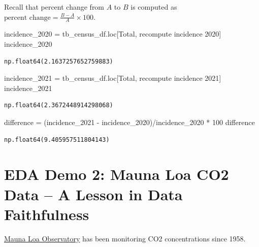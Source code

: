 \documentclass[
  letterpaper,
  DIV=11,
  numbers=noendperiod]{scrreprt}
\newenvironment{Shaded}{\begin{snugshade}}{\end{snugshade}}
\newcommand{\DecValTok}[1]{\textcolor[rgb]{0.68,0.00,0.00}{#1}}
\newcommand{\NormalTok}[1]{\textcolor[rgb]{0.00,0.23,0.31}{#1}}
\newcommand{\OperatorTok}[1]{\textcolor[rgb]{0.37,0.37,0.37}{#1}}
\newcommand{\StringTok}[1]{\textcolor[rgb]{0.13,0.47,0.30}{#1}}
\begin{document}
Recall that percent change from \(A\) to \(B\) is computed as
\(\text{percent change} = \frac{B - A}{A} \times 100\).

\begin{Shaded}
\begin{Highlighting}[]
\NormalTok{incidence\_2020 }\OperatorTok{=}\NormalTok{ tb\_census\_df.loc[}\StringTok{\textquotesingle{}Total\textquotesingle{}}\NormalTok{, }\StringTok{\textquotesingle{}recompute incidence 2020\textquotesingle{}}\NormalTok{]}
\NormalTok{incidence\_2020}
\end{Highlighting}
\end{Shaded}

\begin{verbatim}
np.float64(2.1637257652759883)
\end{verbatim}

\begin{Shaded}
\begin{Highlighting}[]
\NormalTok{incidence\_2021 }\OperatorTok{=}\NormalTok{ tb\_census\_df.loc[}\StringTok{\textquotesingle{}Total\textquotesingle{}}\NormalTok{, }\StringTok{\textquotesingle{}recompute incidence 2021\textquotesingle{}}\NormalTok{]}
\NormalTok{incidence\_2021}
\end{Highlighting}
\end{Shaded}

\begin{verbatim}
np.float64(2.3672448914298068)
\end{verbatim}

\begin{Shaded}
\begin{Highlighting}[]
\NormalTok{difference }\OperatorTok{=}\NormalTok{ (incidence\_2021 }\OperatorTok{{-}}\NormalTok{ incidence\_2020)}\OperatorTok{/}\NormalTok{incidence\_2020 }\OperatorTok{*} \DecValTok{100}
\NormalTok{difference}
\end{Highlighting}
\end{Shaded}

\begin{verbatim}
np.float64(9.405957511804143)
\end{verbatim}

\section{EDA Demo 2: Mauna Loa CO2 Data -- A Lesson in Data
Faithfulness}\label{eda-demo-2-mauna-loa-co2-data-a-lesson-in-data-faithfulness}

\href{https://gml.noaa.gov/ccgg/trends/data.html}{Mauna Loa Observatory}
has been monitoring CO2 concentrations since 1958.
\end{document}
